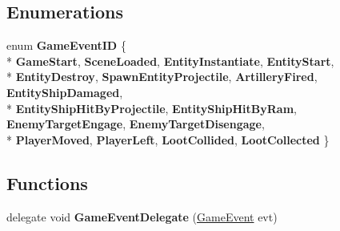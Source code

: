 \subsection*{Enumerations}
\begin{DoxyCompactItemize}
\item 
enum {\bfseries Game\-Event\-I\-D} \{ \\*
{\bfseries Game\-Start}, 
{\bfseries Scene\-Loaded}, 
{\bfseries Entity\-Instantiate}, 
{\bfseries Entity\-Start}, 
\\*
{\bfseries Entity\-Destroy}, 
{\bfseries Spawn\-Entity\-Projectile}, 
{\bfseries Artillery\-Fired}, 
{\bfseries Entity\-Ship\-Damaged}, 
\\*
{\bfseries Entity\-Ship\-Hit\-By\-Projectile}, 
{\bfseries Entity\-Ship\-Hit\-By\-Ram}, 
{\bfseries Enemy\-Target\-Engage}, 
{\bfseries Enemy\-Target\-Disengage}, 
\\*
{\bfseries Player\-Moved}, 
{\bfseries Player\-Left}, 
{\bfseries Loot\-Collided}, 
{\bfseries Loot\-Collected}
 \}
\end{DoxyCompactItemize}
\subsection*{Functions}
\begin{DoxyCompactItemize}
\item 
\hypertarget{namespace_skyrates_1_1_client_1_1_game_1_1_event_a448e5d409dc993bd700f2f7f8161adf7}{delegate void {\bfseries Game\-Event\-Delegate} (\hyperlink{class_skyrates_1_1_client_1_1_game_1_1_event_1_1_game_event}{Game\-Event} evt)}\label{namespace_skyrates_1_1_client_1_1_game_1_1_event_a448e5d409dc993bd700f2f7f8161adf7}

\end{DoxyCompactItemize}
